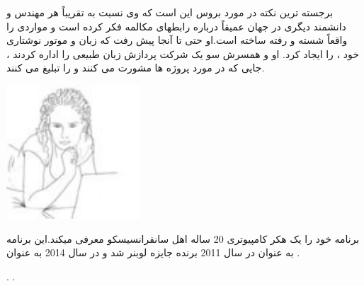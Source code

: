\documentclass[18pt,a4paper]{report}
\begin{document}
 برجسته ترین نکته در مورد بروس این است که وی نسبت به تقریباً هر مهندس و دانشمند دیگری در جهان عمیقاً درباره رابطهای مکالمه فکر کرده است و مواردی را واقعاً شسته و رفته ساخته است.او حتی تا آنجا پیش رفت که زبان و موتور نوشتاری خود ،  را ایجاد کرد. او و همسرش سو یک شرکت پردازش زبان طبیعی  را اداره کردند ، جایی که در مورد پروژه ها مشورت می کنند و  را تبلیغ می کنند. 

 	\begin{center}
 		\includegraphics[width=5cm, height=5cm]{imgs/chatbot_rosette_d____10513.jpg}
 		\label{Rose image}

 	\end{center}

 
 برنامه  خود را یک هکر کامپیوتری 20 ساله اهل سانفرانسیسکو معرفی میکند.این برنامه به عنوان   در سال 2011 برنده جایزه لوبنر شد و در سال 2014 به عنوان  .
 
  
 

\begin{thebibliography}{9}
	\latin
	.
	.
\end{thebibliography}
 	
 	
 	
 
 	
\end{document}
